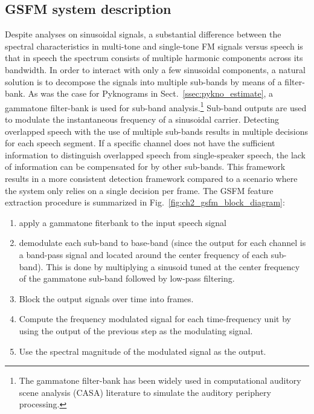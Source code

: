 {\subsection{GSFM system description}
Despite analyses on sinusoidal signals, a substantial difference between the spectral characteristics in multi-tone and single-tone FM signals versus speech is that in speech the spectrum consists of multiple harmonic components across its bandwidth. 
In order to interact with only a few sinusoidal components, a natural solution is to decompose the signals into multiple sub-bands by means of a filter-bank. 
As was the case for Pyknograms in Sect.~\ref{ssec:pykno_estimate}, a gammatone filter-bank is used for sub-band analysis.\footnote{The gammatone filter-bank has been widely used in computational auditory scene analysis (CASA) literature to simulate the auditory periphery processing.} 
Sub-band outputs are used to modulate the instantaneous frequency of a sinusoidal carrier. 
Detecting overlapped speech with the use of multiple sub-bands results in multiple decisions for each speech segment. 
If a specific channel does not have the sufficient information to distinguish overlapped speech from single-speaker speech, the lack of information can be compensated for by other sub-bands. 
This framework results in a more consistent detection framework compared to a scenario where the system only relies on a single decision per frame. 
The GSFM feature extraction procedure is summarized in Fig.~\ref{fig:ch2_gsfm_block_diagram}:

\begin{enumerate}
	\item apply a gammatone fiterbank to the input speech signal
	\item demodulate each sub-band to base-band (since the output for each channel is a band-pass signal and located around the center frequency of each sub-band). 
	This is done by	multiplying a sinusoid tuned at the center frequency of	the gammatone sub-band followed by low-pass filtering.
	\item Block the output signals over time into frames. 
	\item Compute the frequency modulated signal for each time-frequency unit by using the output of the previous step as the modulating signal. 
	\item Use the spectral magnitude of the modulated signal as the output.
\end{enumerate}

}
